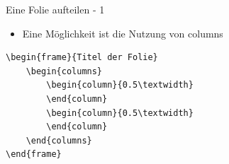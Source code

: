 \documentclass{beamer}
\begin{document}
\begin{frame}[containsverbatim]{Eine Folie aufteilen - 1}
\begin{itemize}
    \item Eine Möglichkeit ist die Nutzung von columns
\end{itemize}
\begin{lstlisting}
\begin{frame}{Titel der Folie}
    \begin{columns}
        \begin{column}{0.5\textwidth}
        \end{column}
        \begin{column}{0.5\textwidth}
        \end{column}
    \end{columns}
\end{frame}
\end{lstlisting}
\end{frame}
\end{document}
